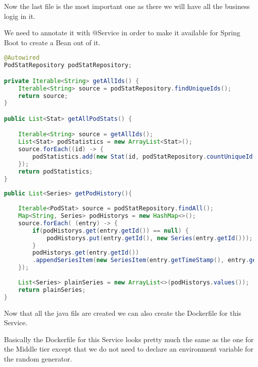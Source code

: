 Now the last file is the most important one as there we will have all the business logig in it.

We need to annotate it with @Service in order to make it available for Spring Boot to create a Bean out of it.


\begin{lstlisting}[language=Java]
@Autowired
PodStatRepository podStatRepository;

private Iterable<String> getAllIds() {
	Iterable<String> source = podStatRepository.findUniqueIds();
	return source;
}

public List<Stat> getAllPodStats() {

	Iterable<String> source = getAllIds();
	List<Stat> podStatistics = new ArrayList<Stat>();
	source.forEach((id) -> {
		podStatistics.add(new Stat(id, podStatRepository.countUniqueId(id)));
	});
	return podStatistics;
}
	
public List<Series> getPodHistory(){
		
	Iterable<PodStat> source = podStatRepository.findAll();	
	Map<String, Series> podHistorys = new HashMap<>();	
	source.forEach( (entry) -> {				
		if(podHistorys.get(entry.getId()) == null) {			
			podHistorys.put(entry.getId(), new Series(entry.getId()));			
		}
		podHistorys.get(entry.getId())
		.appendSeriesItem(new SeriesItem(entry.getTimeStamp(), entry.getCounter()));							
	});
		
	List<Series> plainSeries = new ArrayList<>(podHistorys.values());
	return plainSeries;	
}
\end{lstlisting}

Now that all the java fils are created we can also create the Dockerfile for this Service.



Basically the Dockerfile for this Service looks pretty much the same as the one for the Middle tier except that we do not need to declare an environment variable for the random generator.
